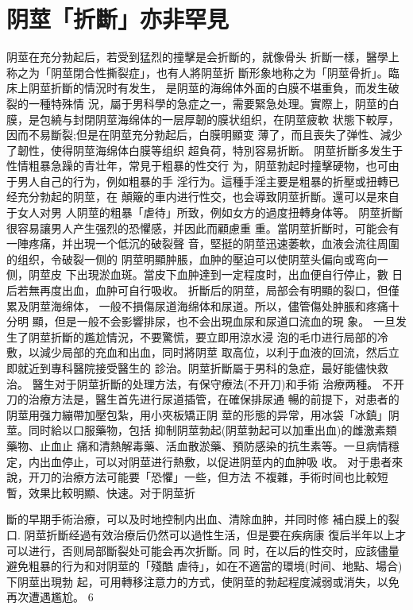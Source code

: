 \documentclass[12pt,UTF8]{ctexbook}
\begin{document}
\section{阴莖「折斷」亦非罕見}
阴莖在充分勃起后，若受到猛烈的撞擊是会折斷的，就像骨头
折斷一樣，醫學上称之为「阴莖閉合性撕裂症」，也有人將阴莖折
斷形象地称之为「阴莖骨折」。臨床上阴莖折斷的情況时有发生，
是阴莖的海绵体外面的白膜不堪重負，而发生破裂的一種特殊情
況，屬于男科學的急症之一，需要緊急处理。實際上，阴莖的白
膜，是包繞与封閉阴莖海绵体的一层厚韌的膜状组织，在阴莖疲軟
状態下較厚，因而不易斷裂;但是在阴莖充分勃起后，白膜明顯变
薄了，而且喪失了弹性、減少了韌性，使得阴莖海绵体白膜等组织
超負荷，特別容易折断。
阴莖折斷多发生于性情粗暴急躁的青壮年，常見于粗暴的性交行
为，阴莖勃起时撞擊硬物，也可由于男人自己的行为，例如粗暴的手
淫行为。這種手淫主要是粗暴的折壓或扭轉已经充分勃起的阴莖，在
顛簸的車内进行性交，也会導致阴莖折斷。還可以是來自于女人对男
人阴莖的粗暴「虐待」所致，例如女方的過度扭轉身体等。
阴莖折斷很容易讓男人产生强烈的恐懼感，并因此而顧慮重
重。當阴莖折斷时，可能会有一陣疼痛，并出現一个低沉的破裂聲
音，堅挺的阴莖迅速萎軟，血液会流往周圍的组织，令破裂一侧的
阴莖明顯肿脹，血肿的壓迫可以使阴莖头偏向或弯向一侧，阴莖皮
下出現淤血斑。當皮下血肿達到一定程度时，出血便自行停止，數
日后若無再度出血，血肿可自行吸收。
折斷后的阴莖，局部会有明顯的裂口，但僅累及阴莖海绵体，
一般不損傷尿道海绵体和尿道。所以，儘管傷处肿脹和疼痛十分明
顯，但是一般不会影響排尿，也不会出現血尿和尿道口流血的現
象。
一旦发生了阴莖折斷的尷尬情況，不要驚慌，要立即用涼水浸
泡的毛巾进行局部的冷敷，以減少局部的充血和出血，同时將阴莖
取高位，以利于血液的回流，然后立即就近到專科醫院接受醫生的
診治。阴莖折斷屬于男科的急症，最好能儘快救治。
醫生对于阴莖折斷的处理方法，有保守療法(不开刀)和手術
治療两種。
不开刀的治療方法是，醫生首先进行尿道插管，在確保排尿通
暢的前提下，对患者的阴莖用强力繃帶加壓包紮，用小夾板矯正阴
莖的形態的异常，用冰袋「冰鎮」阴莖。同时給以口服藥物，包括
抑制阴莖勃起(阴莖勃起可以加重出血)的雌激素類藥物、止血止
痛和清熱解毒藥、活血散淤藥、預防感染的抗生素等。一旦病情穩
定，内出血停止，可以对阴莖进行熱敷，以促进阴莖内的血肿吸
收。
对于患者來說，开刀的治療方法可能要「恐懼」一些，但方法
不複雜，手術时间也比較短暫，效果比較明顯、快速。对于阴莖折

斷的早期手術治療，可以及时地控制内出血、清除血肿，并同时修
補白膜上的裂口.
阴莖折斷经過有效治療后仍然可以過性生活，但是要在疾病康
復后半年以上才可以进行，否则局部斷裂处可能会再次折斷。同
时，在以后的性交时，应該儘量避免粗暴的行为和对阴莖的「殘酷
虐待」，如在不適當的環境(时间、地點、場合)下阴莖出現勃
起，可用轉移注意力的方式，使阴莖的勃起程度減弱或消失，以免
再次遭遇尷尬。
6
\end{document}
